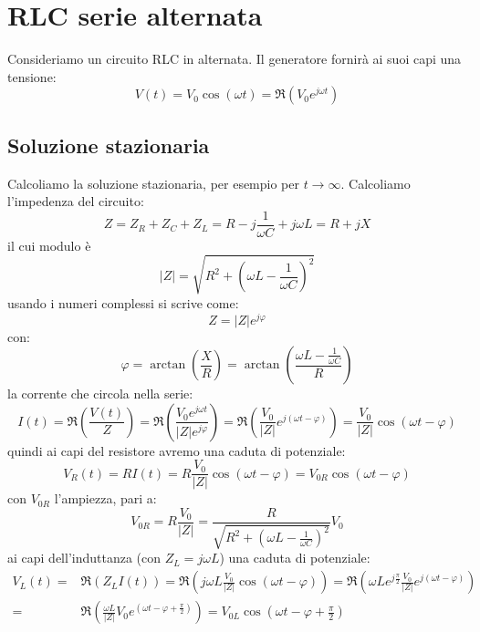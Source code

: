 \section{RLC serie alternata}
Consideriamo un circuito RLC in alternata. Il generatore fornirà ai suoi capi una tensione:
\begin{equation}
  V(t)=V_0\cos\left(\omega t\right)=\Re(V_0 e^{j\omega t})
\end{equation}
\subsection{Soluzione stazionaria}
Calcoliamo la soluzione stazionaria, per esempio per $t\to\infty$. Calcoliamo l'impedenza del circuito:
\begin{equation}
  Z=Z_R+Z_C+Z_L=R-j\frac{1}{\omega C}+j\omega L=R+j X
\end{equation}
il cui modulo è
\begin{equation}
  |Z|=\sqrt{R^2+\left(\omega L-\frac{1}{\omega C}\right)^2}
\end{equation}
usando i numeri complessi si scrive come:
\begin{equation}
  Z=|Z|e^{j\varphi}
\end{equation}
con:
\begin{equation}
  \varphi=\arctan\left(\frac{X}{R}\right)=\arctan\left(\frac{\omega L-\frac{1}{\omega C}}{R}\right)
\end{equation}
la corrente che circola nella serie:
\begin{equation}
  I(t)=\Re\left({\frac{V(t)}{Z}}\right)=\Re\left({\frac{V_0e^{j\omega t}}{|Z|e^{j\varphi}}}\right)=\Re\left({\frac{V_0}{|Z|}e^{j(\omega t-\varphi)}}\right)=\frac{V_0}{|Z|}\cos(\omega t-\varphi)
\end{equation}
quindi ai capi del resistore avremo una caduta di potenziale:
\begin{equation}
  V_R(t)=RI(t)=R\frac{V_0}{|Z|}\cos(\omega t-\varphi)=V_{0R}\cos(\omega t-\varphi)
\end{equation}
con $V_{0R}$ l'ampiezza, pari a:
\begin{equation}
  V_{0R}=R\frac{V_0}{|Z|}=\frac{R}{\sqrt{R^2+\left(\omega L-\frac{1}{\omega C}\right)^2}}V_0
\end{equation}
ai capi dell'induttanza (con $Z_L=j\omega L$) una caduta di potenziale:
\begin{equation}
  \begin{split}
    V_L(t)=&\Re\left(Z_LI(t)\right)=\Re\left(j\omega L\frac{V_0}{|Z|}\cos(\omega t-\varphi)\right)=\Re\left(\omega Le^{j\frac{\pi}{2}}\frac{V_0}{|Z|}e^{j(\omega t-\varphi)}\right)\\
    =&\Re\left(\frac{\omega L}{|Z|}V_0e^{\left(\omega t-\varphi+\frac{\pi}{2}\right)}\right)=V_{0L}\cos\left(\omega t-\varphi+\frac{\pi}{2}\right)
  \end{split}
\end{equation}
